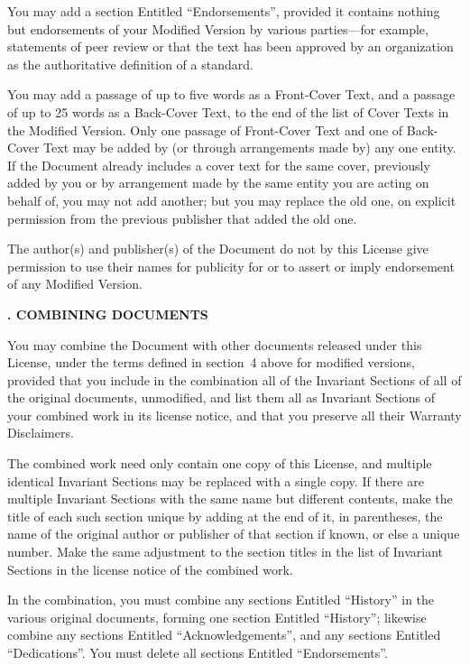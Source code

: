 You may add a section Entitled ``Endorsements'', provided it contains
nothing but endorsements of your Modified Version by various
parties---for example, statements of peer review or that the text has
been approved by an organization as the authoritative definition of a
standard.

You may add a passage of up to five words as a Front-Cover Text, and a
passage of up to 25 words as a Back-Cover Text, to the end of the list
of Cover Texts in the Modified Version.  Only one passage of
Front-Cover Text and one of Back-Cover Text may be added by (or
through arrangements made by) any one entity.  If the Document already
includes a cover text for the same cover, previously added by you or
by arrangement made by the same entity you are acting on behalf of,
you may not add another; but you may replace the old one, on explicit
permission from the previous publisher that added the old one.

The author(s) and publisher(s) of the Document do not by this License
give permission to use their names for publicity for or to assert or
imply endorsement of any Modified Version.


\begin{flushleft}
    {\large\bfseries{}. COMBINING DOCUMENTS\par}
\end{flushleft}


You may combine the Document with other documents released under this
License, under the terms defined in section~4 above for modified
versions, provided that you include in the combination all of the
Invariant Sections of all of the original documents, unmodified, and
list them all as Invariant Sections of your combined work in its
license notice, and that you preserve all their Warranty Disclaimers.

The combined work need only contain one copy of this License, and
multiple identical Invariant Sections may be replaced with a single
copy.  If there are multiple Invariant Sections with the same name but
different contents, make the title of each such section unique by
adding at the end of it, in parentheses, the name of the original
author or publisher of that section if known, or else a unique number.
Make the same adjustment to the section titles in the list of
Invariant Sections in the license notice of the combined work.

In the combination, you must combine any sections Entitled ``History''
in the various original documents, forming one section Entitled
``History''; likewise combine any sections Entitled ``Acknowledgements'',
and any sections Entitled ``Dedications''.  You must delete all sections
Entitled ``Endorsements''.

